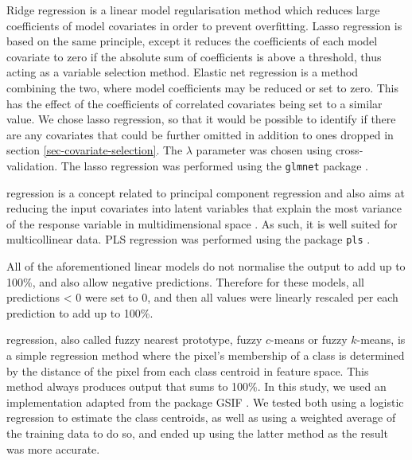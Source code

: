 \documentclass[review,authoryear,3p]{elsarticle}
\begin{document}

Ridge regression is a linear model regularisation method which reduces large coefficients of model covariates in order to prevent overfitting.
Lasso regression is based on the same principle, except it reduces the coefficients of each model covariate to zero if the absolute sum of coefficients is above a threshold, thus acting as a variable selection method.
Elastic net regression is a method combining the two, where model coefficients may be reduced or set to zero.
This has the effect of the coefficients of correlated covariates being set to a similar value.
We chose lasso regression, so that it would be possible to identify if there are any covariates that could be further omitted in addition to ones dropped in section \ref{sec-covariate-selection}.
The $\lambda$ parameter was chosen using cross-validation.
The lasso regression was performed using the \texttt{glmnet} package \citep{glmnet}.


 regression is a concept related to principal component regression and also aims at reducing the input covariates into latent variables that explain the most variance of the response variable in multidimensional space \citep{martens_multivariate_1992}.
As such, it is well suited for multicollinear data.
\ac{PLS} regression was performed using the package \texttt{pls} \citep{pls}.

All of the aforementioned linear models do not normalise the output to add up to 100\%, and also allow negative predictions.
Therefore for these models, all predictions < 0 were set to 0, and then all values were linearly rescaled per each prediction to add up to 100\%.


 regression, also called fuzzy nearest prototype, fuzzy $c$-means or fuzzy $k$-means, is a simple regression method where the pixel's membership of a class is determined by the distance of the pixel from each class centroid in feature space.
This method always produces output that sums to 100\%.
In this study, we used an implementation adapted from the package GSIF \citep{hengl2004fuzzycmeans}.
We tested both using a logistic regression to estimate the class centroids, as well as using a weighted average of the training data to do so, and ended up using the latter method as the result was more accurate.
\end{document}
